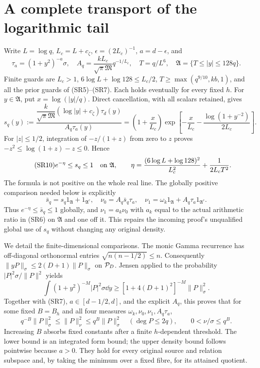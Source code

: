 \documentclass[11pt,a4paper]{article}
\begin{document}
\section{A complete transport of the logarithmic tail}
Write $L=\log q$, $L_c=L+c_\zeta$, $\epsilon=(2L_c)^{-1}$,
$a=d-\epsilon$, and
\begin{equation}\tag{SR8}
 \tau_a=(1+y^2)^{-a}\sigma,\quad
 A_q=\frac{kL_c}{\sqrt\pi\mathfrak M}q^{-1/L_c},\quad
 T=q/L^6,\quad \mathfrak A=\{T\le |y|\le128q\}.
\end{equation}
Finite guards are $L_c>1$, $6\log L+\log128\le L_c/2$,
$T\ge\max(q^{9/10},kb,1)$, and all the prior guards of (SR5)--(SR7).
Each holds eventually for every fixed $h$. For $y\in\mathfrak A$, put
$x=\log(|y|/q)$. Direct cancellation, with all scalars retained, gives
\begin{equation}\tag{SR9}
 s_q(y):=\frac{\dfrac{k}{\sqrt\pi\mathfrak M}
 (\log|y|+c_\zeta)\tau_d(y)}{A_q\tau_a(y)}
 =\left(1+\frac{x}{L_c}\right)
 \exp\left[-\frac{x}{L_c}
 -\frac{\log(1+y^{-2})}{2L_c}\right].
\end{equation}
For $|z|\le1/2$, integration of $-z/(1+z)$ from zero to $z$ proves
$-z^2\le\log(1+z)-z\le0$. Hence
\begin{equation}\tag{SR10}
 e^{-\eta}\le s_q\le1\quad\hbox{on }\mathfrak A,
 \qquad \eta=\frac{(6\log L+\log128)^2}{L_c^2}
                   +\frac1{2L_cT^2}.
\end{equation}
The formula is not positive on the whole real line. The globally positive
comparison needed below is explicitly
\begin{equation}\tag{SR11}
 \bar s_q=s_q1_{\mathfrak A}+1_{\mathfrak A^c},\quad
 \nu_0=A_q\bar s_q\tau_a,\quad
 \nu_1=\omega_k1_{\mathfrak A}+A_q\tau_a1_{\mathfrak A^c}.
\end{equation}
Thus $e^{-\eta}\le\bar s_q\le1$ globally, and
$\nu_1=a_k\nu_0$ with $a_k$ equal to the actual arithmetic ratio in (SR6)
on $\mathfrak A$ and one off it. This repairs the incoming proof's unqualified
global use of $s_q$ without changing any original density.

We detail the finite-dimensional comparisons. The monic Gamma recurrence
has off-diagonal orthonormal entries $\sqrt{n(n-1/2)}\le n$.
Consequently $\|yP\|_\sigma\le2(D+1)\|P\|_\sigma$ on $\mathcal P_D$.
Jensen applied to the probability $|P|^2\sigma/\|P\|^2$ yields
\begin{equation}\tag{SR12}
 \int(1+y^2)^{-M}|P|^2\sigma\dd y
 \ge[1+4(D+1)^2]^{-M}\|P\|_\sigma^2.
\end{equation}
Together with (SR7), $a\in[d-1/2,d]$, and the explicit $A_q$, this proves
that for some fixed $B=B_h$ and all four measures
$\omega_k,\nu_0,\nu_1,A_q\tau_a$,
\begin{equation}\tag{SR13}
 q^{-B}\|P\|_\sigma^2\le\|P\|_\nu^2\le q^B\|P\|_\sigma^2
 \quad(\deg P\le2q),\qquad 0<\nu/\sigma\le q^B.
\end{equation}
Increasing $B$ absorbs fixed constants after a finite $h$-dependent threshold.
The lower bound is an integrated form bound; the upper density bound follows
pointwise because $a>0$. They hold for every original source and relation
subspace and, by taking the minimum over a fixed fibre, for its attained quotient.
\end{document}
